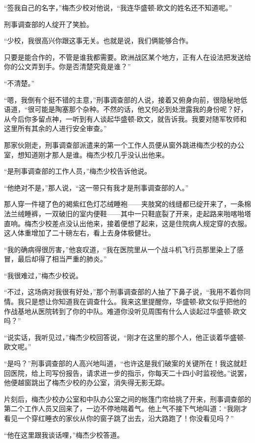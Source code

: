     “签我自己的名字，”梅杰少校对他说，“我连华盛顿-欧文的姓名还不知道呢。”

    刑事调查部的人绽开了笑脸。

    “少校，我很高兴你跟这事无关。也就是说，我们俩能够合作。

    只要是能合作的，不管是谁我都需要。欧洲战区某个地方，正有人在设法把发送给你的公文弄到手。你是否清楚究竟是谁？”

    “不清楚。”

    “嗯，我倒有个挺不错的主意，”刑事调查部的人说，接着又俯身向前，很隐秘地低语道，“很可能是陶塞那个杂种。不然的话，他又何必到处泄露我的身份呢？好，从今后你多留点神，一听到有人谈起华盛顿-欧文，就告诉我。我要对随军牧师和这里所有其余的人进行安全审查。”

    那家伙刚走，刑事调查部派遣来的第一个工作人员便从窗外跳进梅杰少校的办公室，想知道刚才那人是谁。梅杰少校几乎没认出他来。

    “是刑事调查部的工作人员，”梅杰少校告诉他说。

    “他绝对不是，”那人说，“这一带只有我才是刑事调查部的人。”

    那人穿一件褪了色的褐紫红色灯芯绒睡袍——夹肢窝的线缝都已绽开来了，一条棉法兰绒睡裤，一双破旧的室内便鞋——其中一只鞋底裂了开来，走起路来啪喀啪塔直响。梅杰少校差点没认出他来，接着便想了起来，这是住院病人规定穿的衣服。这人体重增加了二十磅左右，看上去身体极健壮。

    “我的确病得很厉害，”他哀叹道，“我在医院里从一个战斗机飞行员那里染上了感冒，最后却得了相当严重的肺炎。”

    “我很难过，”梅杰少校说。

    “不过，这场病对我很有好处，”那个刑事调查部的人抽了下鼻子说，“我用不着你同情。我只是想让你知道我在调查什么。我来这里提醒你，华盛顿-欧文似乎把他的作战基地从医院转到了你的中队。难道你没听见周围有什么人谈起过华盛顿-欧文吗？”

    “说实话，我听见过，”梅杰少校回答说，“刚才在这里的那个人，他正谈着华盛顿-欧文呢。”

    “是吗？”刑事调查部的人高兴地叫道，“也许这是我们破案的关键所在！我这就赶回医院，给上司写份报告，请求进一步的指示，你每天二十四小时监视他。”说罢，他便越窗跳出了梅杰少校的办公室，消失得无影无踪。

    片刻后，梅杰少校办公室和中队办公室之间的帐篷门帘给挑了开来，刑事调查部的第二个工作人员又回来了，一边不停地喘着气。他上气不接下气地叫道：“我刚才看见一个穿红睡衣的家伙从你的窗子跳了出去，沿大路跑了！你没看见吗？”

    “他在这里跟我谈话哩，”梅杰少校答道。

